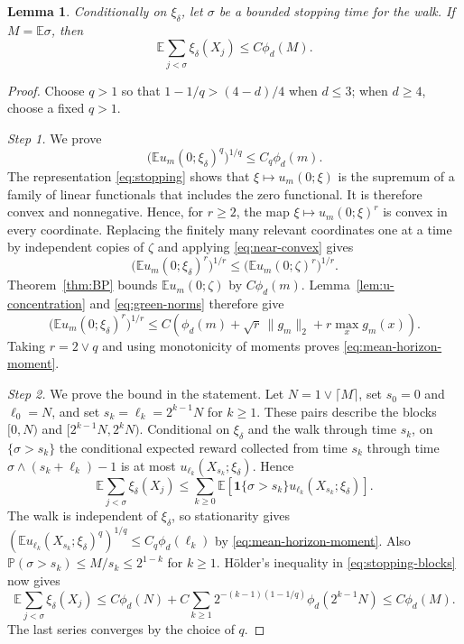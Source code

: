 \documentclass[11pt]{amsart}
\theoremstyle{plain}
\newtheorem{lemma}[theorem]{Lemma}
\theoremstyle{definition}
\newcommand{\E}{\mathbb{E}}
\renewcommand{\P}{\mathbb{P}}
\newcommand{\one}{\mathbf{1}}
\begin{document}
\begin{lemma}\label{lem:mean-horizon}
	Conditionally on $\xi_\delta$, let $\sigma$ be a bounded stopping time for the
	walk. If $M=\E\sigma$, then
	\[
		\E\sum_{j<\sigma}\xi_\delta(X_j)\leq C\phi_d(M).
	\]
\end{lemma}

\begin{proof}
	Choose $q>1$ so that $1-1/q>(4-d)/4$ when $d\leq3$; when
	$d\geq4$, choose a fixed $q>1$.

	\smallskip
	\noindent\emph{Step 1.} We prove
	\begin{equation}\label{eq:mean-horizon-moment}
		\bigl(\E u_m(0;\xi_\delta)^q\bigr)^{1/q}\leq C_q\phi_d(m).
	\end{equation}
    The representation \eqref{eq:stopping} shows that
    $\xi\mapsto u_m(0;\xi)$ is the supremum of a family of linear
    functionals that includes the zero functional. It is therefore convex and
    nonnegative. Hence, for $r\geq2$, the map $\xi\mapsto u_m(0;\xi)^r$ is convex in every coordinate.
	Replacing the finitely many relevant coordinates one at a time by independent
	copies of $\zeta$ and applying \eqref{eq:near-convex} gives
	\[
		\bigl(\E u_m(0;\xi_\delta)^r\bigr)^{1/r}
		\leq\bigl(\E u_m(0;\zeta)^r\bigr)^{1/r}.
	\]
	Theorem~\ref{thm:BP} bounds $\E u_m(0;\zeta)$ by $C\phi_d(m)$.
	Lemma~\ref{lem:u-concentration} and
	\eqref{eq:green-norms} therefore give
	\begin{equation}\label{eq:near-centered-moment}
		\bigl(\E u_m(0;\xi_\delta)^r\bigr)^{1/r}
		\leq C\left(\phi_d(m)+\sqrt r\,\|g_m\|_2
		+r\max_xg_m(x)\right).
	\end{equation}
	Taking $r=2\vee q$ and using monotonicity of moments proves
	\eqref{eq:mean-horizon-moment}.

	\smallskip
	\noindent\emph{Step 2.} We prove the bound in the statement.
	Let $N=1\vee\lceil M\rceil$, set $s_0=0$ and $\ell_0=N$, and set
	$s_k=\ell_k=2^{k-1}N$ for $k\geq1$. These pairs describe the blocks
	$[0,N)$ and $[2^{k-1}N,2^kN)$. Conditional on $\xi_\delta$ and the walk through
	time $s_k$, on $\{\sigma>s_k\}$ the conditional expected reward collected
	from time $s_k$ through time $\sigma\wedge(s_k+\ell_k)-1$ is at most
	$u_{\ell_k}(X_{s_k};\xi_\delta)$. Hence
	\begin{equation}\label{eq:stopping-blocks}
		\E\sum_{j<\sigma}\xi_\delta(X_j)
		\leq\sum_{k\geq0}\E\left[
		\one\{\sigma>s_k\}u_{\ell_k}(X_{s_k};\xi_\delta)\right].
	\end{equation}
	The walk is independent of $\xi_\delta$, so stationarity gives
	$(\E u_{\ell_k}(X_{s_k};\xi_\delta)^q)^{1/q}\leq C_q\phi_d(\ell_k)$ by
	\eqref{eq:mean-horizon-moment}. Also
	$\P(\sigma>s_k)\leq M/s_k\leq2^{1-k}$ for $k\geq1$.
	H\"older's inequality in \eqref{eq:stopping-blocks} now gives
	\[
		\E\sum_{j<\sigma}\xi_\delta(X_j)
		\leq C\phi_d(N)+C\sum_{k\geq1}
		2^{-(k-1)(1-1/q)}\phi_d(2^{k-1}N)
		\leq C\phi_d(M).
	\]
	The last series converges by the choice of $q$.
\end{proof}
\end{document}
